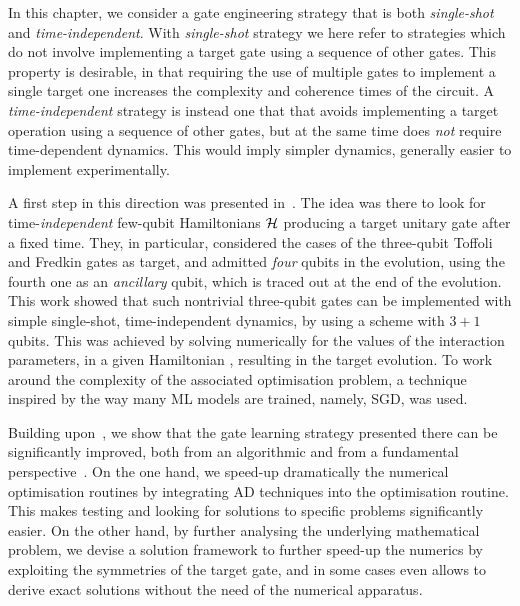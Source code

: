 In this chapter, we consider a gate engineering strategy that is both \emph{single-shot} and \emph{time-independent}. With \emph{single-shot} strategy we here refer to strategies which do not involve implementing a target gate using a sequence of other gates. This property is desirable, in that requiring the use of multiple gates to implement a single target one increases the complexity and coherence times of the circuit.
A \emph{time-independent} strategy is instead one that that avoids implementing a target operation using a sequence of other gates, but at the same time does \emph{not} require time-dependent dynamics. This would imply simpler dynamics, generally easier to implement experimentally.

A first step in this direction was presented in~\cite{banchi2016quantum}.
The idea was there to look for time-\emph{independent} few-qubit Hamiltonians ${\mathcal{H}}$ producing a target unitary gate after a fixed time. They, in particular, considered the cases of the three-qubit Toffoli and Fredkin gates as target, and admitted \emph{four} qubits in the evolution, using the fourth one as an \emph{ancillary} qubit, which is traced out at the end of the evolution.
This work showed that such nontrivial three-qubit gates can be implemented with simple single-shot, time-independent dynamics, by using a scheme with $3+1$ qubits.
This was achieved by solving numerically for the values of the interaction parameters, in a given Hamiltonian \ansatz, resulting in the target evolution.
To work around the complexity of the associated optimisation problem, a technique inspired by the way many \ac{ML} models are trained, namely, \ac{SGD}, was used.

Building upon~\cite{banchi2016quantum}, we show that the gate learning strategy presented there can be significantly improved, both from an algorithmic and from a fundamental perspective~\cite{innocenti2018supervised}.
On the one hand, we speed-up dramatically the numerical optimisation routines by integrating \ac{AD} techniques into the optimisation routine. This makes testing and looking for solutions to specific problems significantly easier.
On the other hand, by further analysing the underlying mathematical problem, we devise a solution framework to further speed-up the numerics by exploiting the symmetries of the target gate, and in some cases even allows to derive exact solutions without the need of the numerical apparatus.

